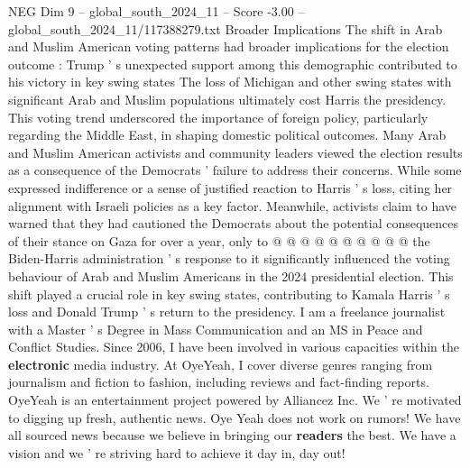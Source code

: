 \begin{textsample}{NEG Dim 9 – global\_south\_2024\_11 – Score -3.00 – global\_south\_2024\_11/117388279.txt}
Broader Implications The shift in Arab and Muslim American voting patterns had broader implications for the election outcome : Trump ' s unexpected support among this demographic contributed to his victory in key swing states The loss of Michigan and other swing states with significant Arab and Muslim populations ultimately cost Harris the presidency.
This voting trend underscored the importance of foreign policy, particularly regarding the Middle East, in shaping domestic political outcomes.
Many Arab and Muslim American activists and community leaders viewed the election results as a consequence of the Democrats ' failure to address their concerns.
While some expressed indifference or a sense of justified reaction to Harris ' s loss, citing her alignment with Israeli policies as a key factor.
Meanwhile, activists claim to have warned that they had cautioned the Democrats about the potential consequences of their stance on Gaza for over a year, only to @ @ @ @ @ @ @ @ @ @ the Biden-Harris administration ' s response to it significantly influenced the voting behaviour of Arab and Muslim Americans in the 2024 presidential election.
This shift played a crucial role in key swing states, contributing to Kamala Harris ' s loss and Donald Trump ' s return to the presidency.
I am a freelance journalist with a Master ' s Degree in Mass Communication and an MS in Peace and Conflict Studies.
Since 2006, I have been involved in various capacities within the \textbf{electronic} media industry.
At OyeYeah, I cover diverse genres ranging from journalism and fiction to fashion, including reviews and fact-finding reports.
OyeYeah is an entertainment project powered by Alliancez Inc.
We ' re motivated to digging up fresh, authentic news.
Oye Yeah does not work on rumors!
We have all sourced news because we believe in bringing our \textbf{readers} the best.
We have a vision and we ' re striving hard to achieve it day in, day out!

\end{textsample}
